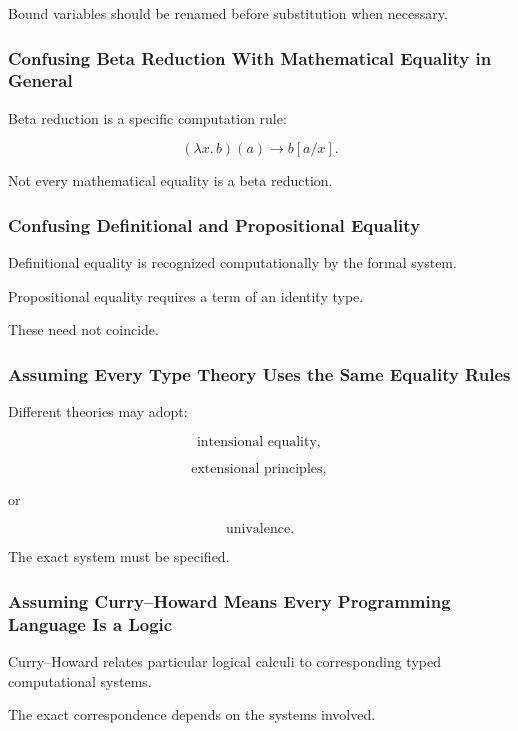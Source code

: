 Bound variables should be renamed before substitution when necessary.

\subsubsection{Confusing Beta Reduction With Mathematical Equality in General}

Beta reduction is a specific computation rule:

\[
(\lambda x.\,b)(a)
\longrightarrow
b[a/x].
\]

Not every mathematical equality is a beta reduction.

\subsubsection{Confusing Definitional and Propositional Equality}

Definitional equality is recognized computationally by the formal system.

Propositional equality requires a term of an identity type.

These need not coincide.

\subsubsection{Assuming Every Type Theory Uses the Same Equality Rules}

Different theories may adopt:

\[
\boxed{
\text{intensional equality},
}
\]

\[
\boxed{
\text{extensional principles},
}
\]

or

\[
\boxed{
\text{univalence}.
}
\]

The exact system must be specified.

\subsubsection{Assuming Curry--Howard Means Every Programming Language Is a Logic}

Curry--Howard relates particular logical calculi to corresponding typed
computational systems.

The exact correspondence depends on the systems involved.

